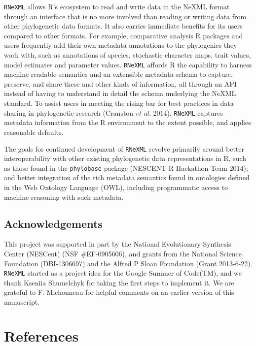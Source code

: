 \documentclass[author-year, review, 11pt]{components/elsarticle} %
\begin{document}
\texttt{RNeXML} allows R's ecosystem to read and write data in the NeXML
format through an interface that is no more involved than reading or
writing data from other phylogenetic data formats. It also carries
immediate benefits for its users compared to other formats. For example,
comparative analysis R packages and users frequently add their own
metadata annotations to the phylogenies they work with, such as
annotations of species, stochastic character maps, trait values, model
estimates and parameter values. \texttt{RNeXML} affords R the capability
to harness machine-readable semantics and an extensible metadata schema
to capture, preserve, and share these and other kinds of information,
all through an API instead of having to understand in detail the schema
underlying the NeXML standard. To assist users in meeting the rising bar
for best practices in data sharing in phylogenetic research (Cranston
\emph{et al.} 2014), \texttt{RNeXML} captures metadata information from
the R environment to the extent possible, and applies reasonable
defaults.

The goals for continued development of \texttt{RNeXML} revolve primarily
around better interoperability with other existing phylogenetic data
representations in R, such as those found in the \texttt{phylobase}
package (NESCENT R Hackathon Team 2014); and better integration of the
rich metadata semantics found in ontologies defined in the Web Ontology
Language (OWL), including programmatic access to machine reasoning with
such metadata.

\subsection{Acknowledgements}\label{acknowledgements}

This project was supported in part by the National Evolutionary
Synthesis Center (NESCent) (NSF \#EF-0905606), and grants from the
National Science Foundation (DBI-1306697) and the Alfred P Sloan
Foundation (Grant 2013-6-22). \texttt{RNeXML} started as a project idea
for the Google Summer of Code(TM), and we thank Kseniia Shumelchyk for
taking the first steps to implement it. We are grateful to F. Michonneau
for helpful comments on an earlier version of this manuscript.

\section*{References}\label{references}
\end{document}
